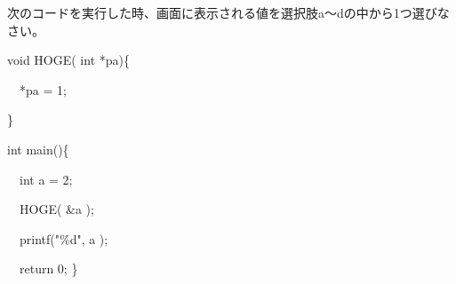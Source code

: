 次のコードを実行した時、画面に表示される値を選択肢a〜dの中から1つ選びなさい。\par
\noindent void HOGE( int *pa)\{ \par
\noindent 　*pa = 1; \par
\noindent \} \par
\noindent int main()\{ \par
\noindent 　int a = 2; \par
\noindent 　HOGE( \&a ); \par
\noindent 　printf("\%d", a ); \par
\noindent 　return 0; \} \par
